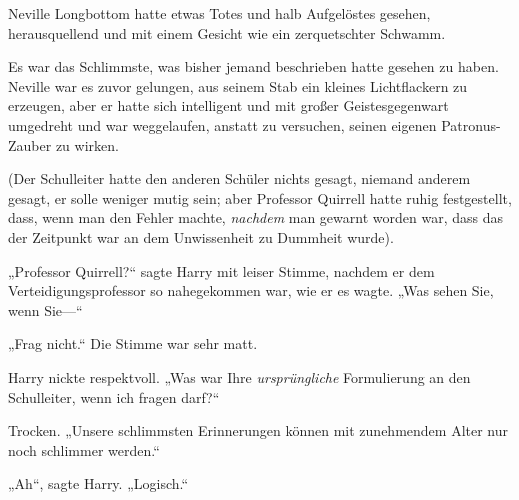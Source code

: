 \later

Neville Longbottom hatte etwas Totes und halb Aufgelöstes gesehen, herausquellend und mit einem Gesicht wie ein zerquetschter Schwamm.

Es war das Schlimmste, was bisher jemand beschrieben hatte gesehen zu haben. Neville war es zuvor gelungen, aus seinem Stab ein kleines Lichtflackern zu erzeugen, aber er hatte sich intelligent und mit großer Geistesgegenwart umgedreht und war weggelaufen, anstatt zu versuchen, seinen eigenen Patronus-Zauber zu wirken.

(Der Schulleiter hatte den anderen Schüler nichts gesagt, niemand anderem gesagt, er solle weniger mutig sein; aber Professor Quirrell hatte ruhig festgestellt, dass, wenn man den Fehler machte, \emph{nachdem} man gewarnt worden war, dass das der Zeitpunkt war an dem Unwissenheit zu Dummheit wurde).

„Professor Quirrell?“ sagte Harry mit leiser Stimme, nachdem er dem Verteidigungsprofessor so nahegekommen war, wie er es wagte. „Was sehen Sie, wenn Sie—“

„Frag nicht.“ Die Stimme war sehr matt.

Harry nickte respektvoll. „Was war Ihre \emph{ursprüngliche} Formulierung an den Schulleiter, wenn ich fragen darf?“

Trocken. „Unsere schlimmsten Erinnerungen können mit zunehmendem Alter nur noch schlimmer werden.“

„Ah“, sagte Harry. „Logisch.“


